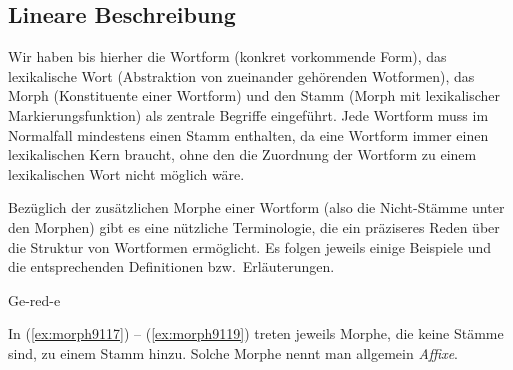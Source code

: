 \label{sec:morphstruktur}

\subsection{Lineare Beschreibung}

\label{sec:morphlinterm}

Wir haben bis hierher die Wortform (konkret vorkommende Form), das lexikalische Wort (Abstraktion von zueinander gehörenden Wotformen), das Morph (Konstituente einer Wortform) und den Stamm (Morph mit lexikalischer Markierungsfunktion) als zentrale Begriffe eingeführt.
Jede Wortform muss im Normalfall mindestens einen Stamm enthalten, da eine Wortform immer einen lexikalischen Kern braucht, ohne den die Zuordnung der Wortform zu einem lexikalischen Wort nicht möglich wäre.

Bezüglich der zusätzlichen Morphe einer Wortform (also die Nicht-Stämme unter den Morphen) gibt es eine nützliche Terminologie, die ein präziseres Reden über die Struktur von Wortformen ermöglicht.
Es folgen jeweils einige Beispiele und die entsprechenden Definitionen bzw.\ Erläuterungen.

\begin{exe}
  \ex\label{ex:morph9117}
  \begin{xlist}
  \end{xlist}
  \ex\label{ex:morph9118}
  \begin{xlist}
  \end{xlist}
  \ex\label{ex:morph9119}{Ge-red-e}
\end{exe}

In (\ref{ex:morph9117}) -- (\ref{ex:morph9119}) treten jeweils Morphe, die keine Stämme sind, zu einem Stamm hinzu.
Solche Morphe nennt man allgemein \textit{Affixe}.



